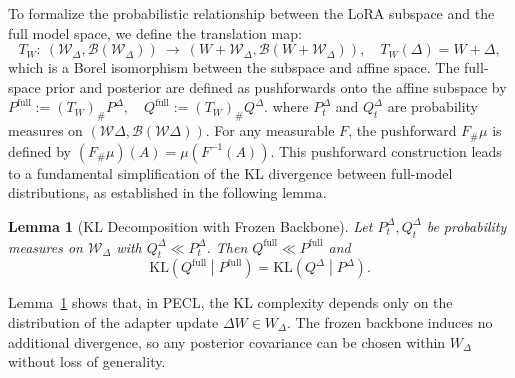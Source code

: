 \documentclass[10pt]{article} %
\newtheorem{lemma}{Lemma}
\begin{document}
To formalize the probabilistic relationship between the LoRA subspace and the full model space, we define the translation map:
\[
T_W:\ (\mathcal W_\Delta,\mathcal B(\mathcal W_\Delta))\ \to\ (W+\mathcal W_\Delta,\mathcal B(W+\mathcal W_\Delta)),\quad
T_W(\Delta)=W+\Delta,
\]
which is a Borel isomorphism between the subspace and affine space.  The full-space prior and posterior are defined as pushforwards onto the affine subspace by
$
P^{\mathrm{full}}:=(T_W)_{\text{\#}} P^{\Delta},\quad
Q^{\mathrm{full}}:=(T_W)_{\text{\#}} Q^{\Delta}.
$
where $P_t^{\Delta}$ and $Q_t^{\Delta}$ are probability measures on $(\mathcal{W}\Delta, \mathcal{B}(\mathcal{W}\Delta))$.
For any measurable $F$, the pushforward $F_{\text{\#}}\mu$ is defined by $(F_{\#}\mu)(A)=\mu(F^{-1}(A))$. This pushforward construction leads to a fundamental simplification of the KL divergence between full-model distributions, as established in the following lemma.


\begin{lemma}[KL Decomposition with Frozen Backbone]
\label{lem:kl-decomposition}
Let $P_t^{\Delta}, Q_t^{\Delta}$ be probability measures on $\mathcal{W}_\Delta$ with $Q_t^{\Delta} \ll P_t^{\Delta}$. Then $Q^{\mathrm{full}}\ll P^{\mathrm{full}}$ and
\[
\mathrm{KL}\left(Q^{\mathrm{full}}\middle|P^{\mathrm{full}}\right)
=\mathrm{KL}\left(Q^{\Delta}\middle|P^{\Delta}\right).
\]
\end{lemma}

Lemma~\ref{lem:kl-decomposition} shows that, in PECL, the KL complexity depends only on the distribution of the adapter update $\Delta W \in W_\Delta$. The frozen backbone induces no additional divergence, so any posterior covariance can be chosen within $W_\Delta$ without loss of generality.

\end{document}
